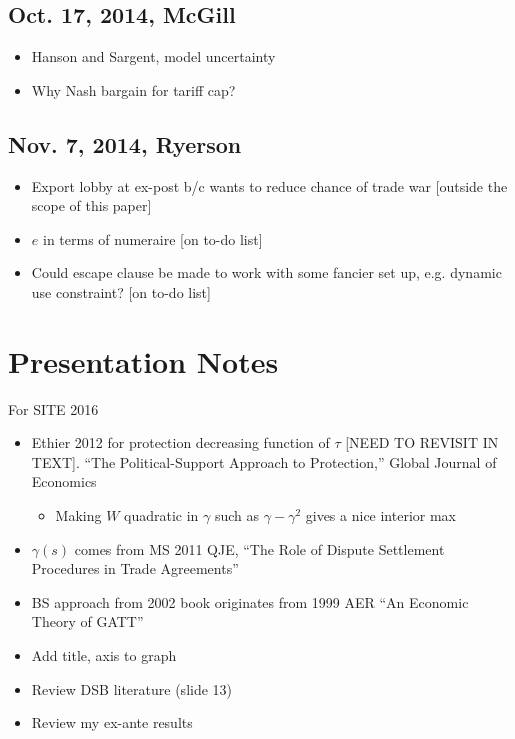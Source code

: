 \documentclass[12pt]{article}
\newcommand{\ga}{\gamma}
\begin{document}
\subsection{Oct. 17, 2014, McGill}
\begin{itemize}
	\item Hanson and Sargent, model uncertainty
	\item Why Nash bargain for tariff cap?
\end{itemize}

\subsection{Nov. 7, 2014, Ryerson}
\begin{itemize}
	\item Export lobby at ex-post b/c wants to reduce chance of trade war [outside the scope of this paper]
	\item $e$ in terms of numeraire [on to-do list]
	\item Could escape clause be made to work with some fancier set up, e.g. dynamic use constraint? [on to-do list]
\end{itemize}


\newpage
\section{Presentation Notes}
For SITE 2016
\begin{itemize}
	\item Ethier 2012 for protection decreasing function of $\tau$ [NEED TO REVISIT IN TEXT]. ``The Political-Support Approach to Protection,'' Global Journal of Economics
		\begin{itemize}
			\item Making $W$ quadratic in $\ga$ such as $\ga - \ga^2$ gives a nice interior max
		\end{itemize}
	\item $\ga(s)$ comes from MS 2011 QJE, ``The Role of Dispute Settlement Procedures in Trade Agreements''
	\item BS approach from 2002 book originates from 1999 AER ``An Economic Theory of GATT''
	\item Add title, axis to graph
	\item Review DSB literature (slide 13)
	\item Review my ex-ante results
\end{itemize}
\end{document}

